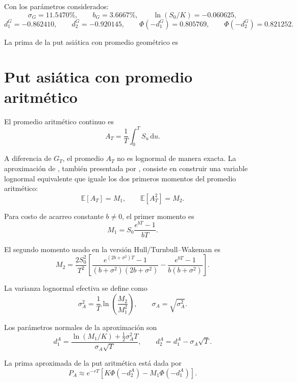 \documentclass[11pt,letterpaper]{article}
\newcommand{\E}{\mathbb{E}}
\newcommand{\dd}{\,\mathrm{d}}
\newcommand{\PhiN}{\Phi}
\begin{document}
Con los parámetros considerados:
\[
\sigma_G=11.5470\%,
\qquad
b_G=3.6667\%,
\qquad
\ln(S_0/K)=-0.060625,
\]
\[
d_1^G=-0.862410,
\qquad
 d_2^G=-0.920145,
\qquad
\PhiN(-d_1^G)=0.805769,
\qquad
\PhiN(-d_2^G)=0.821252.
\]

La prima de la put asiática con promedio geométrico es
\resultbox{
\[
P_G=4.6922.
\]
}

\section{Put asiática con promedio aritmético}

El promedio aritmético continuo es
\begin{equation}
A_T=\frac{1}{T}\int_0^T S_u\dd u.
\end{equation}

A diferencia de \(G_T\), el promedio \(A_T\) no es lognormal de manera exacta. La aproximación de \citet{turnbull1991}, también presentada por \citet{hull2018}, consiste en construir una variable lognormal equivalente que iguale los dos primeros momentos del promedio aritmético:
\begin{equation}
\E[A_T]=M_1,
\qquad
\E[A_T^2]=M_2.
\end{equation}

Para costo de acarreo constante \(b\neq 0\), el primer momento es
\begin{equation}
M_1=S_0\frac{e^{bT}-1}{bT}.
\end{equation}

El segundo momento usado en la versión Hull/Turnbull--Wakeman es
\begin{equation}
M_2=\frac{2S_0^2}{T^2}
\left[
\frac{e^{(2b+\sigma^2)T}-1}{(b+\sigma^2)(2b+\sigma^2)}
-
\frac{e^{bT}-1}{b(b+\sigma^2)}
\right].
\end{equation}

La varianza lognormal efectiva se define como
\begin{equation}
\sigma_A^2=\frac{1}{T}\ln\left(\frac{M_2}{M_1^2}\right),
\qquad
\sigma_A=\sqrt{\sigma_A^2}.
\end{equation}

Los parámetros normales de la aproximación son
\begin{equation}
d_1^A=\frac{\ln(M_1/K)+\frac{1}{2}\sigma_A^2T}{\sigma_A\sqrt{T}},
\qquad
 d_2^A=d_1^A-\sigma_A\sqrt{T}.
\end{equation}

La prima aproximada de la put aritmética está dada por
\begin{equation}
P_A\approx e^{-rT}\left[K\PhiN(-d_2^A)-M_1\PhiN(-d_1^A)\right].
\end{equation}
\end{document}
